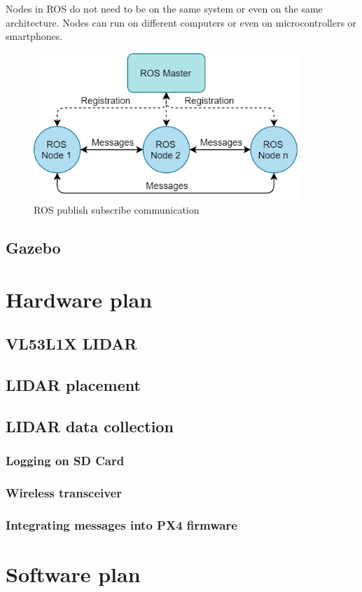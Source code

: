 Nodes in ROS do not need to be on the same system or even on the same architecture. Nodes can run on different 
computers or even on microcontrollers or smartphones.

\begin{figure}[!ht]
    \centering
    \includegraphics[width=100mm, keepaspectratio]{figures/ros_pubsub.png}
    \caption{ROS publish subscribe communication}
    \label{fig:ros_pubsub}
\end{figure}



\subsection{Gazebo}


\newpage
\section{Hardware plan}
\subsection{VL53L1X LIDAR}
\subsection{LIDAR placement}
\subsection{LIDAR data collection}
\subsubsection{Logging on SD Card}
\subsubsection{Wireless transceiver}
\subsubsection{Integrating messages into PX4 firmware}

\section{Software plan}
